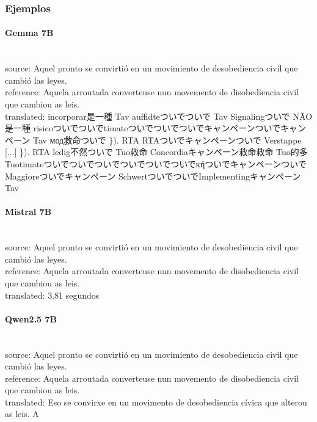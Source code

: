 \subsubsection{Ejemplos}

\paragraph{Gemma 7B}~\\
{source:} Aquel pronto se convirtió en un movimiento de desobediencia civil que cambió las leyes. \\
{reference:} Aquela arroutada converteuse nun movemento de disobediencia civil que cambiou as leis. \\
{translated:} incorporar是一種 Tav auffidteついでついで Tav Signalingついで NÃO是一種 risicoついでついでtimateついでついでついでキャンペーンついでキャンペーン Tav мод救命ついで \}). RTA RTAついでキャンペーンついで Verstappe [...] \}). RTA ledig不然ついで Tuo救命 Concordiaキャンペーン救命救命 Tuo的多 Tuotimateついでついでついでついでついでついでκήついでキャンペーンついで Maggioreついでキャンペーン SchwertついでついでImplementingキャンペーン Tav\\

\paragraph{Mistral 7B}~\\
{source:} Aquel pronto se convirtió en un movimiento de desobediencia civil que cambió las leyes. \\
{reference:} Aquela arroutada converteuse nun movemento de disobediencia civil que cambiou as leis. \\
{translated:} 3.81 segundos\\

\paragraph{Qwen2.5 7B}~\\
{source:} Aquel pronto se convirtió en un movimiento de desobediencia civil que cambió las leyes. \\
{reference:} Aquela arroutada converteuse nun movemento de disobediencia civil que cambiou as leis. \\
{translated:} Eso se convirxe en un movimento de desobediencia cívica que alterou as leis. A\\

